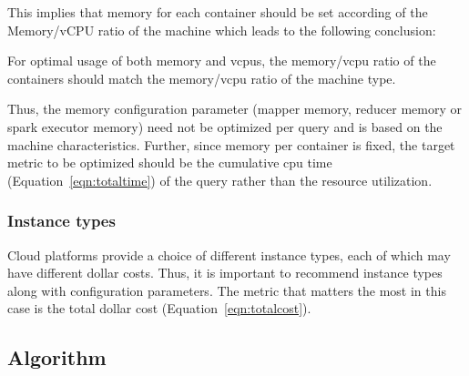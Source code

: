 This implies that memory for each container should be set according of the Memory/vCPU ratio of the machine which leads to the following conclusion:
\begin{insight}
	\label{insight:memcpu}
	For optimal usage of both memory and vcpus, the memory/vcpu ratio of the containers should match the memory/vcpu ratio of the machine type.
\end{insight}
Thus, the memory configuration parameter (mapper memory, reducer memory or spark executor memory) need not be optimized per query and is based on the machine characteristics. Further, since memory per container is fixed, the target metric to be optimized should be the cumulative cpu time (Equation~\ref{eqn:totaltime}) of the query rather than the resource utilization. 

\noindent\subsubsection*{Instance types}

Cloud platforms provide a choice of different instance types, each of which may have different dollar costs. Thus, it is important to recommend instance types along with configuration parameters. The metric that matters the most in this case is the total dollar cost (Equation~\ref{eqn:totalcost}).

\subsection{Algorithm}

